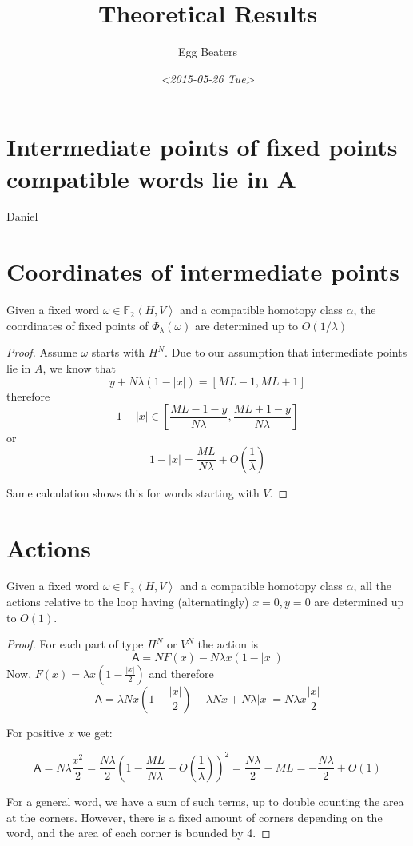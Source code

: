 \documentclass{article}
\author{Egg Beaters}
\date{\textit{<2015-05-26 Tue>}}
\title{Theoretical Results}
\begin{document}
\maketitle
\pagebreak

\section{Intermediate points of fixed points compatible words lie in A}
\label{sec-1}
Daniel

\pagebreak

\section{Coordinates of intermediate points}
\label{sec-2}
\begin{claim}
Given a fixed word \( \omega \in \mathbb{F}_2 \left\langle H,V \right\rangle  \) and a compatible homotopy class $\alpha$, the coordinates of fixed points of \( \Phi_\lambda(\omega)  \) are determined up to \( O(1/\lambda)  \)
\end{claim}
\begin{proof}
Assume \( \omega  \) starts with \( H^N \). Due to our assumption that intermediate points lie in \( A  \), we know that
\[  y + N \lambda (1 - |x|) = [ML - 1, ML + 1]  \]
therefore
\[ 1 - \left| x \right| \in \left[ \frac{ML - 1 - y}{N \lambda}, \frac{ML + 1 - y}{N \lambda} \right] \]
or
\[ 1 - \left| x \right| = \frac{ML}{N\lambda} + O(\frac{1}{\lambda}) \]

Same calculation shows this for words starting with \( V  \).
\end{proof}

\pagebreak
\section{Actions}
\label{sec-3}
\begin{claim}
Given a fixed word \( \omega \in \mathbb{F}_2 \left\langle H,V \right\rangle  \) and a compatible homotopy class $\alpha$, all the actions relative to the loop having (alternatingly) \( x=0,y=0  \) are determined up to \( O(1) \).
\end{claim}
\begin{proof}
For each part of type \( H^N  \) or \( V^N  \) the action is
\[ \mathsf{A} = N F(x) - N \lambda x (1- \left| x \right|) \]
Now, \( F(x) = \lambda x (1 - \frac{\left| x \right|}{2})  \) and therefore
\[ \mathsf{A} = \lambda N x(1 - \frac{\left| x \right|}{2}) - \lambda N x + N \lambda \left| x \right| = N \lambda x \frac{\left| x \right|}{2} \]

For positive \( x  \) we get:

\[ \mathsf{A} = N \lambda \frac{x^2}{2} = \frac{N \lambda}{2} \left( 1 - \frac{ML}{N \lambda} - O(\frac{1}{\lambda}) \right)^2 = \frac{N \lambda}{2} - M L = - \frac{N \lambda}{2} + O(1)  \]

For a general word, we have a sum of such terms, up to double counting the area at the corners. However, there is a fixed amount of corners depending on the word, and the area of each corner is bounded by 4.
\end{proof}
\end{document}
